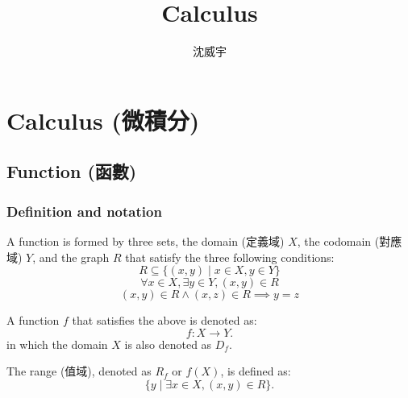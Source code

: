 \documentclass[a4paper,12pt]{report}
\begin{document}
\title{Calculus}
\author{沈威宇}
\date{\temtoday}
\titletocdoc
\chapter{Calculus (微積分)}
\section{Function (函數)}
\subsection{Definition and notation}
A function is formed by three sets, the domain (定義域) $X$, the codomain (對應域) $Y$, and the graph $R$ that satisfy the three following conditions:
\[R\subseteq \{(x,y)\mid x\in X,y\in Y\}\]
\[\forall x\in X,\exists y\in Y,\left(x,y\right)\in R \]
\[ (x,y)\in R\land (x,z)\in R\implies y=z\]

A function $f$ that satisfies the above is denoted as:
\[f\colon X\to Y.\]
in which the domain $X$ is also denoted as $D_f$.

The range (值域), denoted as $R_f$ or $f(X)$, is defined as:
\[\{ y \mid \exists x \in X, (x, y) \in R \}.\]
\end{document}
